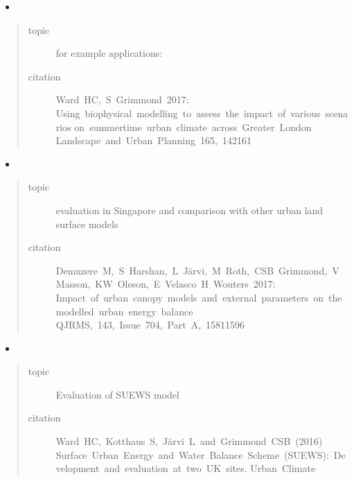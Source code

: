 \documentclass[letterpaper,10pt,english]{sphinxmanual}
\begin{document}
\begin{itemize}
\item {} 

\end{itemize}
\begin{quote}\begin{description}
\item[{topic}] \leavevmode
for example applications:

\item[{citation}] \leavevmode
Ward HC, S Grimmond 2017:
Using biophysical modelling to assess the impact of various scenarios
on summertime urban climate across Greater London
Landscape and Urban Planning 165, 142\textendash{}161

\end{description}\end{quote}
\begin{itemize}
\item {} 

\end{itemize}
\begin{quote}\begin{description}
\item[{topic}] \leavevmode
evaluation in Singapore and comparison with other urban land surface models

\item[{citation}] \leavevmode
Demuzere M, S Harshan, L Järvi, M Roth, CSB Grimmond, V Masson, KW Oleson, E Velasco H Wouters 2017:
Impact of urban canopy models and external parameters on the modelled urban energy balance
QJRMS, 143, Issue 704, Part A, 1581\textendash{}1596

\end{description}\end{quote}
\begin{itemize}
\item {} 

\end{itemize}
\begin{quote}\begin{description}
\item[{topic}] \leavevmode
Evaluation of SUEWS model

\item[{citation}] \leavevmode
Ward HC, Kotthaus S, Järvi L and Grimmond CSB (2016)
Surface Urban Energy and Water Balance Scheme (SUEWS): Development and evaluation at two UK sites.
Urban Climate

\end{description}\end{quote}
\end{document}
